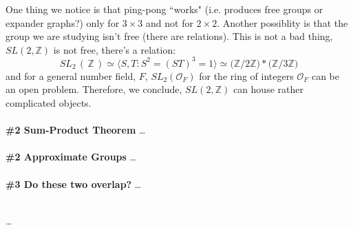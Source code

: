 \documentclass[12pt]{article}
\begin{document}
One thing we notice is that ping-pong ``works" (i.e. produces free groups or expander graphs?) only for $3 \times 3$ and not for $2 \times 2$.  Another possiblity is that the group we are studying isn't free (there are relations).  This is not a bad thing, $SL(2, \mathbb{Z})$ is not free, there's a relation:
$$ SL_2\,(\, \mathbb{Z}\,) \simeq \big\langle S, T: S^2 = (ST)^3 = 1 \big\rangle \simeq \big( \mathbb{Z}/2\mathbb{Z} \big) \ast \big( \mathbb{Z}/3\mathbb{Z} \big) $$
and for a general number field, $F$, $SL_2( \mathcal{O}_F)$ for the ring of integers $\mathcal{O}_F$ can be an open problem.  Therefore, we conclude, $SL(2, \mathbb{Z})$ can house rather complicated objects. \\ \\
\textbf{\#2 Sum-Product Theorem} \dots \\ \\
\textbf{\#2 Approximate Groups} \dots \\ \\
\textbf{\#3 Do these two overlap?} \dots \\ \\

\vfill

\begin{thebibliography}{}

\item \dots

\end{thebibliography}
\end{document}
